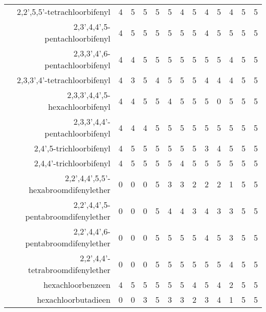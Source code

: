 \begin{tabular}{ r |c | c | c | c | c |c | c | c | c | c | c | c }
2,2',5,5'-tetrachloorbifenyl &4 & 5 & 5 & 5 & 5 & 4 & 5 & 4 & 5 & 4 & 5 & 5 \\
2,3',4,4',5-pentachloorbifenyl &4 & 5 & 5 & 5 & 5 & 5 & 5 & 4 & 5 & 5 & 5 & 5 \\
2,3,3',4',6-pentachloorbifenyl &4 & 4 & 5 & 5 & 5 & 5 & 5 & 5 & 5 & 4 & 5 & 5 \\
2,3,3',4'-tetrachloorbifenyl &4 & 3 & 5 & 4 & 5 & 5 & 5 & 4 & 4 & 4 & 5 & 5 \\
2,3,3',4,4',5-hexachloorbifenyl &4 & 4 & 5 & 5 & 4 & 5 & 5 & 5 & 0 & 5 & 5 & 5 \\
2,3,3',4,4'-pentachloorbifenyl &4 & 4 & 4 & 5 & 5 & 5 & 5 & 5 & 5 & 5 & 5 & 5 \\
2,4',5-trichloorbifenyl &4 & 5 & 5 & 5 & 5 & 5 & 5 & 3 & 4 & 5 & 5 & 5 \\
2,4,4'-trichloorbifenyl &4 & 5 & 5 & 5 & 5 & 4 & 5 & 5 & 5 & 5 & 5 & 5 \\
2,2',4,4',5,5'-hexabroomdifenylether &0 & 0 & 0 & 5 & 3 & 3 & 2 & 2 & 2 & 1 & 5 & 5 \\
2,2',4,4',5-pentabroomdifenylether &0 & 0 & 0 & 5 & 4 & 4 & 3 & 4 & 3 & 3 & 5 & 5 \\
2,2',4,4',6-pentabroomdifenylether &0 & 0 & 0 & 5 & 5 & 5 & 5 & 4 & 5 & 3 & 5 & 5 \\
2,2',4,4'-tetrabroomdifenylether &0 & 0 & 0 & 5 & 5 & 5 & 5 & 5 & 5 & 4 & 5 & 5 \\
hexachloorbenzeen &4 & 5 & 5 & 5 & 5 & 5 & 4 & 5 & 4 & 2 & 5 & 5 \\
hexachloorbutadieen &0 & 0 & 3 & 5 & 3 & 3 & 2 & 3 & 4 & 1 & 5 & 5 \\
\end{tabular}    
